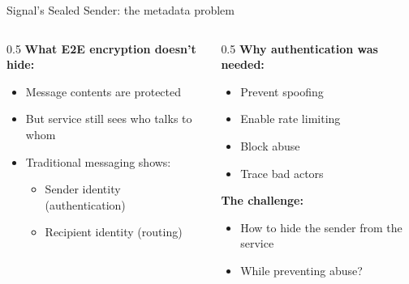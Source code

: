 \ifdefined\PRESENTATION\else\PassOptionsToClass{handout}{beamer}\fi\documentclass[aspectratio=169, lualatex]{beamer}
\begin{document}
\begin{frame}{Signal's Sealed Sender: the metadata problem}
	\begin{columns}
		\begin{column}{0.5\textwidth}
			\textbf{What E2E encryption doesn't hide:}
			\begin{itemize}
				\item Message contents are protected
				\item But service still sees who talks to whom
				\item Traditional messaging shows:
				      \begin{itemize}
					      \item Sender identity (authentication)
					      \item Recipient identity (routing)
				      \end{itemize}
			\end{itemize}
		\end{column}
		\begin{column}{0.5\textwidth}
			\textbf{Why authentication was needed:}
			\begin{itemize}
				\item Prevent spoofing
				\item Enable rate limiting
				\item Block abuse
				\item Trace bad actors
			\end{itemize}
			\textbf{The challenge:}
			\begin{itemize}
				\item How to hide the sender from the service
				\item While preventing abuse?
			\end{itemize}
		\end{column}
	\end{columns}
\end{frame}
\end{document}
